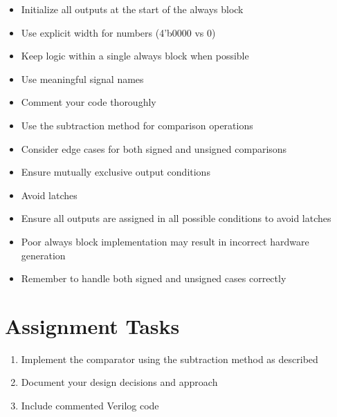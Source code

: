 \documentclass[12pt]{labmanual}
\begin{document}
\begin{extra}
\begin{itemize}
    \item Initialize all outputs at the start of the always block
    \item Use explicit width for numbers (4'b0000 vs 0)
    \item Keep logic within a single always block when possible
    \item Use meaningful signal names
    \item Comment your code thoroughly
    \item Use the subtraction method for comparison operations
    \item Consider edge cases for both signed and unsigned comparisons
    \item Ensure mutually exclusive output conditions
    \item Avoid latches
\end{itemize}
\end{extra}

\begin{extra}
\begin{itemize}
    \item Ensure all outputs are assigned in all possible conditions to avoid latches
    \item Poor always block implementation may result in incorrect hardware generation
    \item Remember to handle both signed and unsigned cases correctly
\end{itemize}
\end{extra}

\section{Assignment Tasks}

\begin{question}
\begin{enumerate}
    \item Implement the comparator using the subtraction method as described
    \item Document your design decisions and approach
    \item Include commented Verilog code
\end{enumerate}
\end{question}
\end{document}
